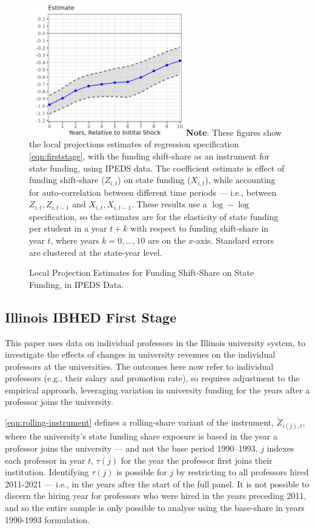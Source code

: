 \begin{figure}[H]
    \centering
    \singlespacing
    \caption{Local Projection Estimates for Funding Shift-Share on State Funding, in IPEDS Data.}
    \includegraphics[width=0.6\textwidth]{figures/firststage-lp.png}
    \label{fig:firststage-lp}
    \justify
    \footnotesize
    \textbf{Note}:
    These figures show the local projections estimates of regression specification \eqref{eqn:firststage}, with the funding shift-share as an instrument for state funding, using IPEDS data.
    The coefficient estimate is effect of funding shift-share ($Z_{i,t}$) on state funding ($X_{i,t}$), while accounting for auto-correlation between different time periods --- i.e., between $Z_{i,t}, Z_{i,t-1}$ and $X_{i,t}, X_{i,t-1}$.
    These results use a $\log-\log$ specification, so the estimates are for the elasticity of state funding per student in a year $t+k$ with respect to funding shift-share in year $t$, where years $k = 0, \hdots, 10$ are on the $x$-axis. 
    Standard errors are clustered at the state-year level.
\end{figure}

\newpage
\subsection{Illinois IBHED First Stage}
\label{sec:iv-model-indiv}

This paper uses data on individual professors in the Illinois university system, to investigate the effects of changes in university revenues on the individual professors at the universities.
The outcomes here now refer to individual professors (e.g., their salary and promotion rate), so requires adjustment to the empirical approach, leveraging variation in university funding for the years after a professor joins the university.

\autoref{eqn:rolling-instrument} defines a rolling-share variant of the instrument, $\tilde Z_{i(j),t}$, where the university's state funding share exposure is based in the year a professor joins the university --- and not the base period 1990--1993.
$j$ indexes each professor in year $t$, $\tau(j)$ for the year the professor first joins their institution.
Identifying $\tau(j)$ is possible for $j$ by restricting to all professors hired 2011-2021 --- i.e., in the years after the start of the full panel.
It is not possible to discern the hiring year for professors who  were hired in the years preceding 2011, and so the entire sample is only possible to analyse using the base-share in years 1990-1993 formulation.

